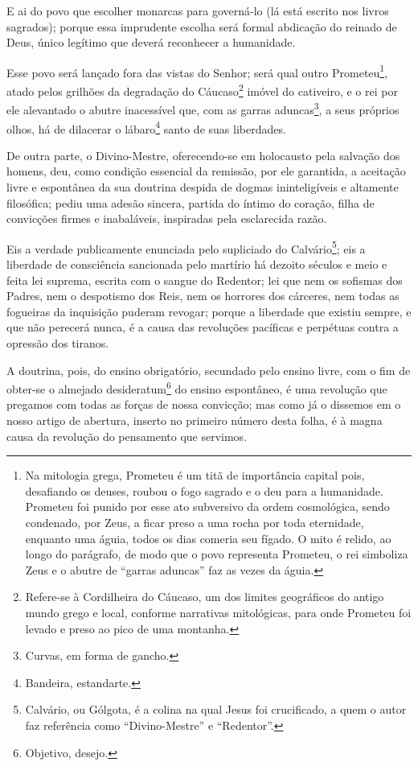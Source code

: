 E ai do povo que escolher monarcas para governá-lo (lá está escrito nos
livros sagrados); porque essa imprudente escolha será formal abdicação
do reinado de Deus, único legítimo que deverá reconhecer a humanidade.

Esse povo será lançado fora das vistas do Senhor; será qual outro
Prometeu\footnote{Na mitologia grega, Prometeu é um titã de
  importância capital pois, desafiando os deuses, roubou o fogo sagrado
  e o deu para a humanidade. Prometeu foi punido por esse ato subversivo
  da ordem cosmológica, sendo condenado, por Zeus, a ficar preso a uma
  rocha por toda eternidade, enquanto uma águia, todos os dias comeria
  seu fígado. O mito é relido, ao longo do parágrafo, de modo que o povo
  representa Prometeu, o rei simboliza Zeus e o abutre de ``garras
  aduncas'' faz as vezes da águia.}, atado pelos grilhões da degradação
do Cáucaso\footnote{Refere-se à Cordilheira do Cáucaso, um dos limites
  geográficos do antigo mundo grego e local, conforme narrativas
  mitológicas, para onde Prometeu foi levado e preso ao pico de uma
  montanha.} imóvel do cativeiro, e o rei por ele alevantado o abutre
inacessível que, com as garras aduncas\footnote{Curvas, em forma de
  gancho.}, a seus próprios olhos, há de dilacerar o lábaro\footnote{
  Bandeira, estandarte.} santo de suas liberdades.

De outra parte, o Divino-Mestre, oferecendo-se em holocausto pela
salvação dos homens, deu, como condição essencial da remissão, por ele
garantida, a aceitação livre e espontânea da sua doutrina despida de
dogmas ininteligíveis e altamente filosófica; pediu uma adesão sincera,
partida do íntimo do coração, filha de convicções firmes e inabaláveis,
inspiradas pela esclarecida razão.

Eis a verdade publicamente enunciada pelo supliciado do
Calvário\footnote{Calvário, ou Gólgota, é a colina na qual Jesus foi
  crucificado, a quem o autor faz referência como ``Divino-Mestre'' e
  ``Redentor''.}; eis a liberdade de consciência sancionada pelo martírio
há dezoito séculos e meio e feita lei suprema, escrita com o sangue do
Redentor; lei que nem os sofismas dos Padres, nem o despotismo dos Reis,
nem os horrores dos cárceres, nem todas as fogueiras da inquisição
puderam revogar; porque a liberdade que existiu sempre, e que não
perecerá nunca, é a causa das revoluções pacíficas e perpétuas contra a
opressão dos tiranos.

A doutrina, pois, do ensino obrigatório, secundado pelo ensino livre,
com o fim de obter-se o almejado desideratum\footnote{Objetivo,
  desejo.} do ensino espontâneo, é uma revolução que pregamos com todas
as forças de nossa convicção; mas como já o dissemos em o nosso artigo
de abertura, inserto no primeiro número desta folha, é à magna causa da
revolução do pensamento que servimos.

